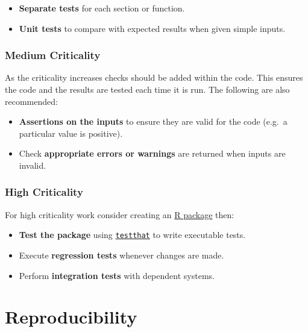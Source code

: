 \documentclass[]{book}
\providecommand{\tightlist}{%
  \setlength{\itemsep}{0pt}\setlength{\parskip}{0pt}}
\begin{document}
\begin{itemize}
\tightlist
\item
  \textbf{Separate tests} for each section or function.
\item
  \textbf{Unit tests} to compare with expected results when given simple inputs.
\end{itemize}

\hypertarget{medium-criticality-1}{%
\subsubsection{Medium Criticality}\label{medium-criticality-1}}

As the criticality increases checks should be added within the code. This ensures the code and
the results are tested each time it is run. The following are also recommended:

\begin{itemize}
\tightlist
\item
  \textbf{Assertions on the inputs} to ensure they are valid for the code (e.g.~a particular value is
  positive).
\item
  Check \textbf{appropriate errors or warnings} are returned when inputs are invalid.
\end{itemize}

\hypertarget{high-criticality-1}{%
\subsubsection{High Criticality}\label{high-criticality-1}}

For high criticality work consider creating an \href{pkg_book}{R package} then:

\begin{itemize}
\tightlist
\item
  \textbf{Test the package} using \href{http://r-pkgs.had.co.nz/tests.html}{\texttt{testthat}} to write
  executable tests.
\item
  Execute \textbf{regression tests} whenever changes are made.
\item
  Perform \textbf{integration tests} with dependent systems.
\end{itemize}

\hypertarget{reproducibility}{%
\section{Reproducibility}\label{reproducibility}}
\end{document}
